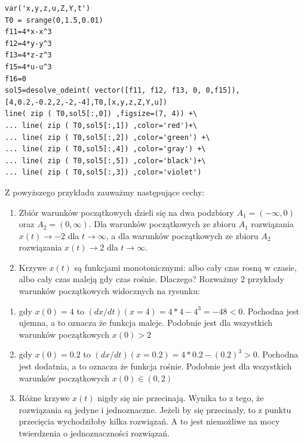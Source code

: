 \documentclass[a4paper,12pt,polish]{sphinxmanual}
\begin{document}
\begin{verbatim}
var('x,y,z,u,Z,Y,t')
T0 = srange(0,1.5,0.01)
f11=4*x-x^3
f12=4*y-y^3
f13=4*z-z^3
f15=4*u-u^3
f16=0
sol5=desolve_odeint( vector([f11, f12, f13, 0, 0,f15]), [4,0.2,-0.2,2,-2,-4],T0,[x,y,z,Z,Y,u])
line( zip ( T0,sol5[:,0]) ,figsize=(7, 4)) +\
... line( zip ( T0,sol5[:,1]) ,color='red')+\
... line( zip ( T0,sol5[:,2]) ,color='green') +\
... line( zip ( T0,sol5[:,4]) ,color='gray') +\
... line( zip ( T0,sol5[:,5]) ,color='black')+\
... line( zip ( T0,sol5[:,3]) ,color='violet')
\end{verbatim}


Z powyższego przykładu zauważmy następujące cechy:
\begin{enumerate}
\item {} 
Zbiór warunków początkowych dzieli się na dwa podzbiory $A_1 = (-\infty, 0)$ oraz  $A_2=(0, \infty)$. Dla warunków  początkowych ze zbioru $A_1$ rozwiązania $x(t) \to -2$ dla $t\to\infty$, a  dla warunków  początkowych ze zbioru $A_2$ rozwiązania $x(t) \to 2$ dla $t\to\infty$.

\item {} 
Krzywe $x(t)$  są funkcjami monotonicznymi: albo cały czas rosną w czasie, albo cały czas maleją gdy czas rośnie. Dlaczego? Rozważmy  2 przykłady warunków początkowych widocznych na rysunku:

\end{enumerate}
\begin{enumerate}
\item {} 
gdy $x(0) = 4$ to $(dx/dt) (x=4) = 4*4 -4^3 = -48 < 0$.   Pochodna jest ujemna, a to oznacza że funkcja maleje. Podobnie jest dla wszystkich warunków początkowych $x(0) > 2$

\item {} 
gdy $x(0) = 0.2$ to $(dx/dt) (x=0.2) = 4*0.2 -(0.2)^3 > 0$.  Pochodna jest dodatnia, a to oznacza że funkcja rośnie. Podobnie jest dla wszystkich warunków początkowych $x(0)  \in (0, 2)$

\end{enumerate}
\begin{enumerate}
\setcounter{enumi}{2}
\item {} 
Różne krzywe $x(t)$ nigdy się nie przecinają. Wynika to z tego, że rozwiązania są jedyne i jednoznaczne. Jeżeli by się przecinały,  to z punktu przecięcia wychodziłoby kilka rozwiązań. A to jest niemożliwe na mocy twierdzenia o jednoznaczności rozwiązań.

\end{enumerate}
\end{document}
